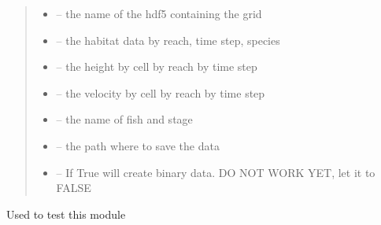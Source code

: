 \documentclass[letterpaper,10pt,english]{sphinxmanual}
\begin{document}
\begin{fulllineitems}
\begin{quote}
\begin{description}
\begin{itemize}
\item {} 
 -- the name of the hdf5 containing the grid

\item {} 
 -- the habitat data by reach, time step, species

\item {} 
 -- the height by cell by reach by time step

\item {} 
 -- the velocity by cell by reach by time step

\item {} 
 -- the name of fish and stage

\item {} 
 -- the path where to save the data

\item {} 
 -- If True will create binary data. DO NOT WORK YET, let it to FALSE

\end{itemize}

\end{description}\end{quote}

\end{fulllineitems}


\begin{fulllineitems}
\label{\detokenize{index:src.new_create_vtk.main}}
Used to test this module

\end{fulllineitems}

\end{document}
